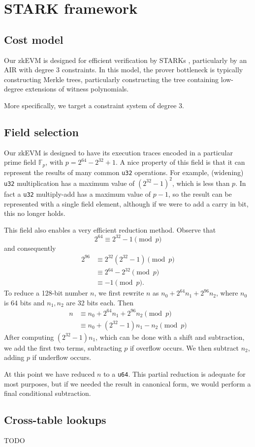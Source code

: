 \section{STARK framework}
\label{framework}


\subsection{Cost model}

Our zkEVM is designed for efficient verification by STARKs \cite{stark}, particularly by an AIR with degree 3 constraints. In this model, the prover bottleneck is typically constructing Merkle trees, particularly constructing the tree containing low-degree extensions of witness polynomials.

More specifically, we target a constraint system of degree 3.


\subsection{Field selection}
\label{field}
Our zkEVM is designed to have its execution traces encoded in a particular prime field $\mathbb{F}_p$, with $p = 2^{64} - 2^{32} + 1$. A nice property of this field is that it can represent the results of many common \texttt{u32} operations. For example, (widening) \texttt{u32} multiplication has a maximum value of $(2^{32} - 1)^2$, which is less than $p$. In fact a \texttt{u32} multiply-add has a maximum value of $p - 1$, so the result can be represented with a single field element, although if we were to add a carry in bit, this no longer holds.

This field also enables a very efficient reduction method. Observe that
$$
2^{64} \equiv 2^{32} - 1 \pmod p
$$
and consequently
\begin{align*}
  2^{96} &\equiv 2^{32} (2^{32} - 1) \pmod p \\
         &\equiv 2^{64} - 2^{32} \pmod p \\
         &\equiv -1 \pmod p.
\end{align*}
To reduce a 128-bit number $n$, we first rewrite $n$ as $n_0 + 2^{64} n_1 + 2^{96} n_2$, where $n_0$ is 64 bits and $n_1, n_2$ are 32 bits each. Then
\begin{align*}
  n &\equiv n_0 + 2^{64} n_1 + 2^{96} n_2 \pmod p \\
  &\equiv n_0 + (2^{32} - 1) n_1 - n_2 \pmod p
\end{align*}
After computing $(2^{32} - 1) n_1$, which can be done with a shift and subtraction, we add the first two terms, subtracting $p$ if overflow occurs. We then subtract $n_2$, adding $p$ if underflow occurs.

At this point we have reduced $n$ to a \texttt{u64}. This partial reduction is adequate for most purposes, but if we needed the result in canonical form, we would perform a final conditional subtraction.


\subsection{Cross-table lookups}
\label{ctl}

TODO
